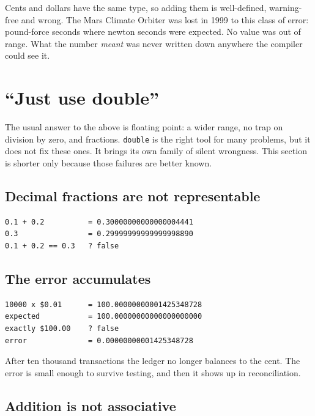 \documentclass[11pt,a4paper]{article}
\newcommand{\code}[1]{\texttt{\small #1}}
\begin{document}
\noindent
Cents and dollars have the same type, so adding them is well-defined,
warning-free and wrong. The Mars Climate Orbiter was lost in 1999 to this class
of error: pound-force seconds where newton seconds were expected. No value was
out of range. What the number \emph{meant} was never written down anywhere the
compiler could see it.

\section{``Just use double''}\label{sec:double}

The usual answer to the above is floating point: a wider range, no trap on
division by zero, and fractions. \code{double} is the right tool for many
problems, but it does not fix these ones. It brings its own family of silent
wrongness. This section is shorter only because those failures are better
known.

\subsection{Decimal fractions are not representable}

\begin{lstlisting}[style=term]
0.1 + 0.2          = 0.30000000000000004441
0.3                = 0.29999999999999998890
0.1 + 0.2 == 0.3   ? false
\end{lstlisting}

\subsection{The error accumulates}


\begin{lstlisting}[style=term]
10000 x $0.01      = 100.00000000001425348728
expected           = 100.00000000000000000000
exactly $100.00    ? false
error              = 0.00000000001425348728
\end{lstlisting}

\noindent
After ten thousand transactions the ledger no longer balances to the cent. The
error is small enough to survive testing, and then it shows up in
reconciliation.

\subsection{Addition is not associative}
\end{document}
